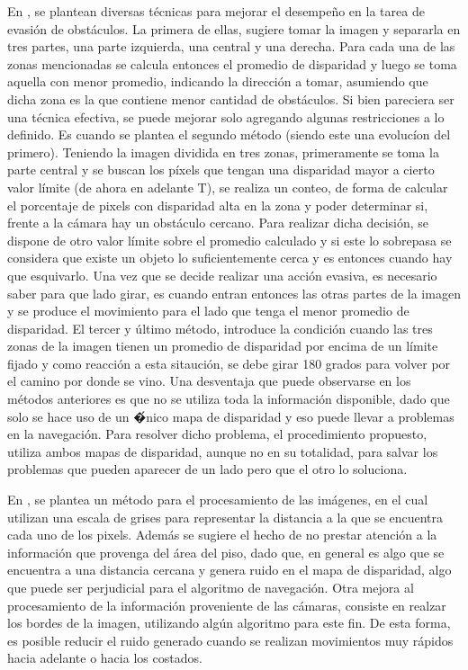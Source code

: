 \documentclass[journal]{IEEEtran}
\begin{document}
En \cite{KNG10}, se plantean diversas t\'ecnicas para mejorar el desempeño en la tarea de evasi\'on de obst\'aculos. La primera de ellas, sugiere tomar la imagen y separarla en tres partes, una parte izquierda, una central y una derecha. Para cada una de las zonas mencionadas se calcula entonces el promedio de disparidad y luego se toma aquella con menor promedio, indicando la direcci\'on a tomar, asumiendo que dicha zona es la que contiene menor cantidad de obst\'aculos. Si bien pareciera ser una t\'ecnica efectiva, se puede mejorar solo agregando algunas restricciones a lo definido. Es cuando se plantea el segundo m\'etodo (siendo este una evoluc\'ion del primero). Teniendo la imagen dividida en tres zonas, primeramente se toma la parte central y se buscan los p\'ixels que tengan una disparidad mayor a cierto valor l\'imite (de ahora en adelante T), se realiza un conteo, de forma de calcular el porcentaje de pixels con disparidad alta en la zona y poder determinar si, frente a la c\'amara hay un obst\'aculo cercano. Para realizar dicha decisi\'on, se dispone de otro valor l\'imite sobre el promedio calculado y si este lo sobrepasa se considera que existe un objeto lo suficientemente cerca y es entonces cuando hay que esquivarlo. Una vez que se decide realizar una acci\'on evasiva, es necesario saber para que lado girar, es cuando entran entonces las otras partes de la imagen y se produce el movimiento para el lado que tenga el menor promedio de disparidad. El tercer y \'ultimo m\'etodo, introduce la condici\'on cuando las tres zonas de la imagen tienen un promedio de disparidad por encima de un l\'imite fijado y como reacci\'on a esta sitauci\'on, se debe girar 180 grados para volver por el camino por donde se vino. Una desventaja que puede observarse en los m\'etodos anteriores es que no se utiliza toda la informaci\'on disponible, dado que solo se hace uso de un \'�nico mapa de disparidad y eso puede llevar a problemas en la navegaci\'on. Para resolver dicho problema, el procedimiento propuesto, utiliza ambos mapas de disparidad, aunque no en su totalidad, para salvar los problemas que pueden aparecer de un lado pero que el otro lo soluciona.

En \cite{RH04}, se plantea un m\'etodo para el procesamiento de las im\'agenes, en el cual utilizan una escala de grises para representar la distancia a la que se encuentra cada uno de los pixels. Adem\'as se sugiere el hecho de no prestar atenci\'on a la informaci\'on que provenga del \'area del piso, dado que, en general es algo que se encuentra a una distancia cercana y genera ruido en el mapa de disparidad, algo que puede ser perjudicial para el algoritmo de navegaci\'on. Otra mejora al procesamiento de la informaci\'on proveniente de las c\'amaras, consiste en realzar los bordes de la imagen, utilizando alg\'un algoritmo para este fin. De esta forma, es posible reducir el ruido generado cuando se realizan movimientos muy r\'apidos hacia adelante o hacia los costados.
\end{document}
